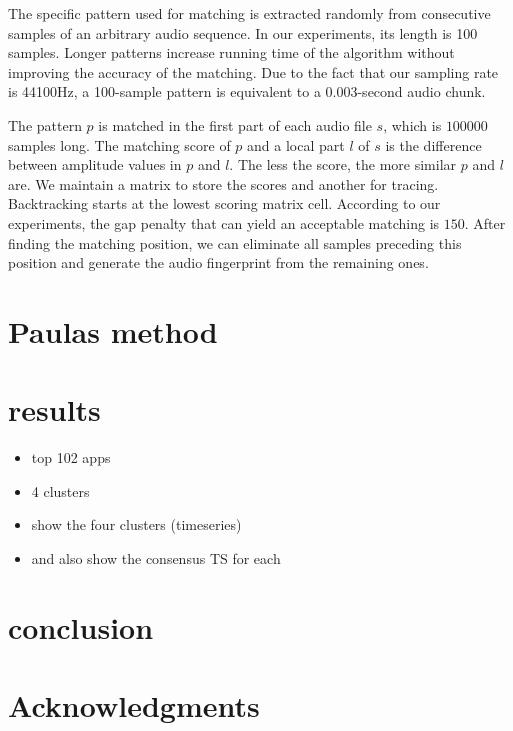 \documentclass{sigchi}
\begin{document}
The specific pattern used for matching is extracted randomly from consecutive samples of an arbitrary audio sequence. 
In our experiments, its length is 100 samples. Longer patterns increase running time of the algorithm without improving the accuracy of the matching. 
Due to the fact that our sampling rate is 44100Hz, a 100-sample pattern is equivalent to a 0.003-second audio chunk. 

The pattern $p$ is matched in the first part of each audio file $s$, which is $100000$ samples long. 
The matching score of $p$ and a local part $l$ of $s$ is the difference between amplitude values in $p$ and $l$. 
The less the score, the more similar $p$ and $l$ are.
We maintain a matrix to store the scores  and another for tracing. 
Backtracking starts at the lowest scoring matrix cell. 
According to our experiments, the gap penalty that can yield an acceptable matching is $150$. 
After finding the matching position, we can eliminate all samples preceding this position and generate the audio fingerprint from the remaining ones.


\section{Paulas method}

\section{results}
\begin{itemize}
\item top 102 apps
\item 4 clusters
\item show the four clusters (timeseries)
\item and also show the consensus TS for each
\end{itemize}


\section{conclusion}

\section{Acknowledgments}

\end{document}
